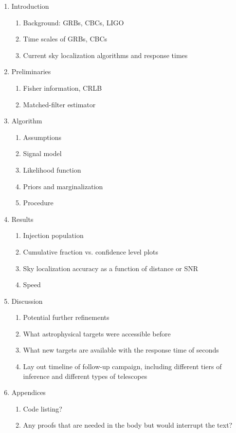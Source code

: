 \documentclass{iopart}
\begin{document}
\begin{enumerate}
\item Introduction {
	\begin{enumerate}
	\item Background: \acp{GRB}, \acp{CBC}, \acs{LIGO}
	\item Time scales of \acp{GRB}, \acp{CBC}
	\item Current sky localization algorithms and response times
	\end{enumerate}
}
\item Preliminaries {
	\begin{enumerate}
	\item Fisher information, \ac{CRLB}
	\item Matched\nobreakdashes-filter estimator
	\end{enumerate}
}
\item Algorithm {
	\begin{enumerate}
	\item Assumptions
	\item Signal model
	\item Likelihood function
	\item Priors and marginalization
	\item Procedure
	\end{enumerate}
}
\item Results {
	\begin{enumerate}
	\item Injection population
	\item Cumulative fraction vs. confidence level plots
	\item Sky localization accuracy as a function of distance or \ac{SNR}
	\item Speed
	\end{enumerate}
}
\item Discussion {
	\begin{enumerate}
	\item Potential further refinements
	\item What astrophysical targets were accessible before
	\item What new targets are available with the response time of seconds
	\item Lay out timeline of follow\nobreakdashes-up campaign, including different tiers of inference and different types of telescopes
	\end{enumerate}
}
\item Appendices {
	\begin{enumerate}
	\item Code listing?
	\item Any proofs that are needed in the body but would interrupt the text?
	\end{enumerate}
}
\end{enumerate}
\end{document}
